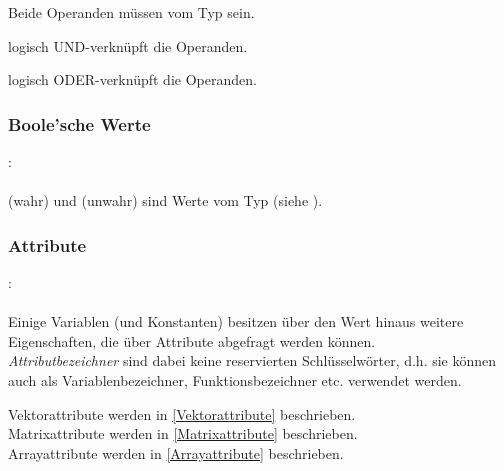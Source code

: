 Beide Operanden müssen vom Typ  sein.

\op{\&\&} logisch UND-verknüpft die Operanden.

\op{||} logisch ODER-verknüpft die Operanden.


\subsubsection{Boole'sche Werte}\label{Boole'sche Werte}
:\label{asdr_konst_bool}\\
\hspace*{1cm}\\

 (wahr) und  (unwahr) sind Werte vom Typ  (siehe ).


\subsubsection{Attribute}\label{Attribute}
:\label{attribut}\\
\hspace*{1cm}\\


Einige Variablen (und Konstanten) besitzen über den Wert hinaus weitere Eigenschaften, die
über Attribute abgefragt werden können. \\
\emph{Attributbezeichner} sind dabei keine reservierten
Schlüsselwörter, d.h. sie können auch als Variablenbezeichner, Funktionsbezeichner etc.
verwendet werden.

\noindent Vektorattribute werden in \ref{Vektorattribute} beschrieben.\\
Matrixattribute werden in \ref{Matrixattribute} beschrieben.\\
Arrayattribute werden in \ref{Arrayattribute} beschrieben.\\


